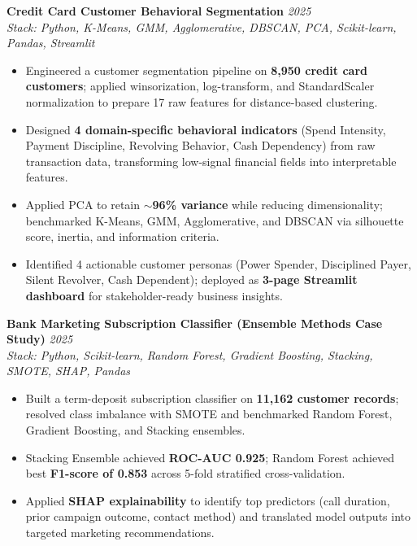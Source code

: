 \documentclass[11pt, a4paper]{article}
\newcommand{\projectEntry}[3]{
  \textbf{#1} \hfill \textit{#2} \\
  \textit{Stack: #3}
  \vspace{2pt}
}
\begin{document}
\vspace{4pt}

\projectEntry{Credit Card Customer Behavioral Segmentation}{2025}
             {Python, K-Means, GMM, Agglomerative, DBSCAN, PCA, Scikit-learn, Pandas, Streamlit}
\begin{itemize}
  \item Engineered a customer segmentation pipeline on \textbf{8,950 credit card customers}; applied winsorization, log-transform, and StandardScaler normalization to prepare 17 raw features for distance-based clustering.
  \item Designed \textbf{4 domain-specific behavioral indicators} (Spend Intensity, Payment Discipline, Revolving Behavior, Cash Dependency) from raw transaction data, transforming low-signal financial fields into interpretable features.
  \item Applied PCA to retain \textbf{$\sim$96\% variance} while reducing dimensionality; benchmarked K-Means, GMM, Agglomerative, and DBSCAN via silhouette score, inertia, and information criteria.
  \item Identified 4 actionable customer personas (Power Spender, Disciplined Payer, Silent Revolver, Cash Dependent); deployed as \textbf{3-page Streamlit dashboard} for stakeholder-ready business insights.
\end{itemize}

\vspace{4pt}

\projectEntry{Bank Marketing Subscription Classifier (Ensemble Methods Case Study)}{2025}
             {Python, Scikit-learn, Random Forest, Gradient Boosting, Stacking, SMOTE, SHAP, Pandas}
\begin{itemize}
  \item Built a term-deposit subscription classifier on \textbf{11,162 customer records}; resolved class imbalance with SMOTE and benchmarked Random Forest, Gradient Boosting, and Stacking ensembles.
  \item Stacking Ensemble achieved \textbf{ROC-AUC 0.925}; Random Forest achieved best \textbf{F1-score of 0.853} across 5-fold stratified cross-validation.
  \item Applied \textbf{SHAP explainability} to identify top predictors (call duration, prior campaign outcome, contact method) and translated model outputs into targeted marketing recommendations.
\end{itemize}

\vspace{2pt}
\end{document}
